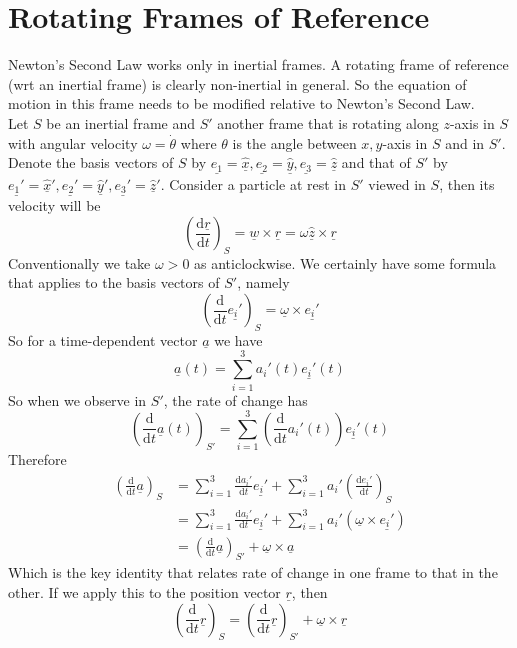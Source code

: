 \section{Rotating Frames of Reference}
Newton's Second Law works only in inertial frames.
A rotating frame of reference (wrt an inertial frame) is clearly non-inertial in general.
So the equation of motion in this frame needs to be modified relative to Newton's Second Law.\\
Let $S$ be an inertial frame and $S'$ another frame that is rotating along $z$-axis in $S$ with angular velocity $\omega=\dot\theta$ where $\theta$ is the angle between $x,y$-axis in $S$ and in $S'$.
Denote the basis vectors of $S$ by $\underline{e_1}=\underline{\hat{x}},\underline{e_2}=\underline{\hat{y}},\underline{e_3}=\underline{\hat{z}}$ and that of $S'$ by $\underline{e_1'}=\underline{\hat{x}}',\underline{e_2'}=\underline{\hat{y}}',\underline{e_3'}=\underline{\hat{z}}'$.
Consider a particle at rest in $S'$ viewed in $S$, then its velocity will be
$$\left( \frac{\mathrm d\underline{r}}{\mathrm dt} \right)_S=\underline{w}\times\underline{r}=\omega\underline{\hat{z}}\times\underline{r}$$
Conventionally we take $\omega>0$ as anticlockwise.
We certainly have some formula that applies to the basis vectors of $S'$, namely
$$\left( \frac{\mathrm d}{\mathrm dt}\underline{e_i'} \right)_S=\underline{\omega}\times\underline{e_i'}$$
So for a time-dependent vector $\underline{a}$ we have
$$\underline{a}(t)=\sum_{i=1}^3a_i'(t)\underline{e_i'}(t)$$
So when we observe in $S'$, the rate of change has
$$\left( \frac{\mathrm d}{\mathrm dt}\underline{a}(t) \right)_{S'}=\sum_{i=1}^3\left( \frac{\mathrm d}{\mathrm dt}a_i'(t) \right)\underline{e_i'}(t)$$
Therefore
\begin{align*}
    \left(\frac{\mathrm d}{\mathrm dt}\underline{a}\right)_S&=\sum_{i=1}^3\frac{\mathrm da_i'}{\mathrm dt}\underline{e_i'}+\sum_{i=1}^3a_i'\left( \frac{\mathrm de_i'}{\mathrm dt} \right)_S\\
    &=\sum_{i=1}^3\frac{\mathrm da_i'}{\mathrm dt}\underline{e_i'}+\sum_{i=1}^3a_i'(\underline{\omega}\times\underline{e_i'})\\
    &=\left( \frac{\mathrm d}{\mathrm dt}\underline{a} \right)_{S'}+\underline{\omega}\times\underline{a}
\end{align*}
Which is the key identity that relates rate of change in one frame to that in the other.
If we apply this to the position vector $\underline{r}$, then
$$\left(\frac{\mathrm d}{\mathrm dt}\underline{r}\right)_S=\left( \frac{\mathrm d}{\mathrm dt}\underline{r} \right)_{S'}+\underline{\omega}\times\underline{r}$$
